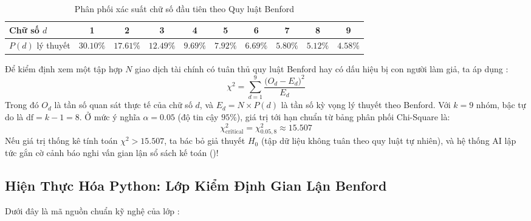 \begin{table}[htbp]
\centering
\small
\caption{Phân phối xác suất chữ số đầu tiên theo Quy luật Benford}
\label{tab:benford-distribution}
\begin{tabular}{lccccccccc}
\toprule
\textbf{Chữ số $d$} & \textbf{1} & \textbf{2} & \textbf{3} & \textbf{4} & \textbf{5} & \textbf{6} & \textbf{7} & \textbf{8} & \textbf{9} \\
\midrule
$P(d)$ lý thuyết & $30.10\%$ & $17.61\%$ & $12.49\%$ & $9.69\%$ & $7.92\%$ & $6.69\%$ & $5.80\%$ & $5.12\%$ & $4.58\%$ \\
\bottomrule
\end{tabular}
\end{table}

Để kiểm định xem một tập hợp $N$ giao dịch tài chính có tuân thủ quy luật Benford hay có dấu hiệu bị con người làm giả, ta áp dụng :
\begin{equation}
\chi^2 = \sum_{d=1}^{9} \frac{\big( O_d - E_d \big)^2}{E_d}
\label{eq:benford-chi-square}
\end{equation}
Trong đó $O_d$ là tần số quan sát thực tế của chữ số $d$, và $E_d = N \times P(d)$ là tần số kỳ vọng lý thuyết theo Benford.
Với $k = 9$ nhóm, bậc tự do là $\text{df} = k - 1 = 8$.
Ở mức ý nghĩa $\alpha = 0.05$ (độ tin cậy $95\%$), giá trị tới hạn chuẩn từ bảng phân phối Chi-Square là:
\begin{equation*}
\chi^2_{\text{critical}} = \chi^2_{0.05, 8} \approx 15.507
\end{equation*}
Nếu giá trị thống kê tính toán $\chi^2 > 15.507$, ta bác bỏ giả thuyết $H_0$ (tập dữ liệu không tuân theo quy luật tự nhiên), và hệ thống AI lập tức gắn cờ cảnh báo nghi vấn gian lận sổ sách kế toán ()!

\subsection{Hiện Thực Hóa Python: Lớp Kiểm Định Gian Lận Benford}
Dưới đây là mã nguồn chuẩn kỹ nghệ của lớp :

